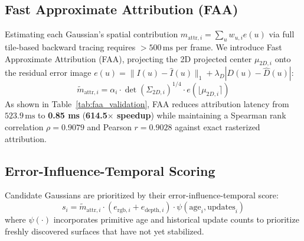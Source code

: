 \documentclass[10pt,twocolumn,letterpaper]{article}
\begin{document}
\subsection{Fast Approximate Attribution (FAA)}
Estimating each Gaussian's spatial contribution $m_{\mathrm{attr}, i} = \sum_u w_{u, i} e(u)$ via full tile-based backward tracing requires $>500\,\mathrm{ms}$ per frame. We introduce Fast Approximate Attribution (FAA), projecting the 2D projected center $\mu_{2D, i}$ onto the residual error image $e(u) = \|I(u) - \hat{I}(u)\|_1 + \lambda_D |D(u) - \hat{D}(u)|$:
\begin{equation}
\tilde{m}_{\mathrm{attr}, i} = \alpha_i \cdot \det(\Sigma_{2D, i})^{1/4} \cdot e(\lfloor \mu_{2D, i} \rceil)
\end{equation}
As shown in Table~\ref{tab:faa_validation}, FAA reduces attribution latency from $523.9\,\mathrm{ms}$ to \textbf{0.85 ms} (\textbf{614.5$\times$ speedup}) while maintaining a Spearman rank correlation $\rho = 0.9079$ and Pearson $r = 0.9028$ against exact rasterized attribution.

\subsection{Error-Influence-Temporal Scoring}
Candidate Gaussians are prioritized by their error-influence-temporal score:
\begin{equation}
s_i = \tilde{m}_{\mathrm{attr}, i} \cdot (e_{\mathrm{rgb}, i} + e_{\mathrm{depth}, i}) \cdot \psi(\text{age}_i, \text{updates}_i)
\end{equation}
where $\psi(\cdot)$ incorporates primitive age and historical update counts to prioritize freshly discovered surfaces that have not yet stabilized.

\begin{table}[t]
\centering
\small
{}
\caption{\textbf{Attribution Fidelity Validation.} Comparing Exact vs Fast Approximate Attribution on TUM RGB-D.}
\label{tab:faa_validation}
\end{table}
\end{document}
